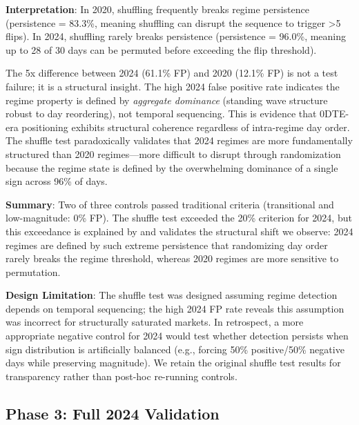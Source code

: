\noindent\textbf{Interpretation}: In 2020, shuffling frequently breaks regime persistence (persistence = 83.3\%, meaning shuffling can disrupt the sequence to trigger >5 flips). In 2024, shuffling rarely breaks persistence (persistence = 96.0\%, meaning up to 28 of 30 days can be permuted before exceeding the flip threshold).

The 5x difference between 2024 (61.1\% FP) and 2020 (12.1\% FP) is not a test failure; it is a structural insight. The high 2024 false positive rate indicates the regime property is defined by \textit{aggregate dominance} (standing wave structure robust to day reordering), not temporal sequencing. This is evidence that 0DTE-era positioning exhibits structural coherence regardless of intra-regime day order. The shuffle test paradoxically validates that 2024 regimes are more fundamentally structured than 2020 regimes—more difficult to disrupt through randomization because the regime state is defined by the overwhelming dominance of a single sign across 96\% of days.

\vspace{0.2cm}

\noindent\textbf{Summary}: Two of three controls passed traditional criteria (transitional and low-magnitude: 0\% FP). The shuffle test exceeded the 20\% criterion for 2024, but this exceedance is explained by and validates the structural shift we observe: 2024 regimes are defined by such extreme persistence that randomizing day order rarely breaks the regime threshold, whereas 2020 regimes are more sensitive to permutation.

\vspace{0.2cm}

\noindent\textbf{Design Limitation}: The shuffle test was designed assuming regime detection depends on temporal sequencing; the high 2024 FP rate reveals this assumption was incorrect for structurally saturated markets. In retrospect, a more appropriate negative control for 2024 would test whether detection persists when sign distribution is artificially balanced (e.g., forcing 50\% positive/50\% negative days while preserving magnitude). We retain the original shuffle test results for transparency rather than post-hoc re-running controls.

\subsection{Phase 3: Full 2024 Validation}

\vspace{0.2cm}

